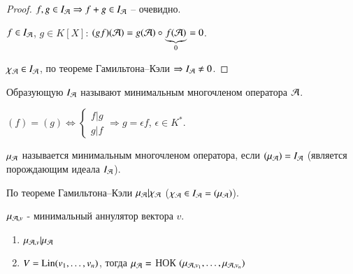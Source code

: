 \documentclass[main]{subfiles}
\begin{document}
\begin{proof}
    $f, g \in I_{\mathcal{A}} \Rightarrow f+g \in I_{\mathcal{A}}$ -- очевидно.

    $f \in I_{\mathcal{A}}$, $g \in K[X]$: $(gf)(\mathcal{A}) = g(\mathcal{A}) \circ \underbrace{f(\mathcal{A})}_{0} = 0$.

    $\chi_{\mathcal{A}} \in I_{\mathcal{A}}$,  по теореме Гамильтона--Кэли $\Rightarrow I_{\mathcal{A}} \neq 0$.
\end{proof}

Образующую $I_{\mathcal{A}}$ называют минимальным многочленом  оператора $\mathcal{A}$.

\begin{remark}
    $(f) = (g) \Leftrightarrow \begin{cases}
            f|g \\
            g|f
        \end{cases} \Rightarrow g = \epsilon f$, $\epsilon \in K^*$.
\end{remark}

\begin{definition} 
    $\mu_{\mathcal{A}}$ называется минимальным многочленом оператора, если $(\mu_{\mathcal{A}}) = I_{\mathcal{A}}$ (является порождающим идеала $I_{\mathcal{A}}$).
\end{definition}

По теореме Гамильтона--Кэли $\mu_{\mathcal{A}}|\chi_{\mathcal{A}}$ ($\chi_{\mathcal{A}} \in I_{\mathcal{A}} = (\mu_{\mathcal{A}})$).

$\mu_{\mathcal{A}, v}$ - минимальный аннулятор вектора $v$.
\begin{proposition}
    \begin{enumerate}
        \item $\mu_{\mathcal{A}, v} | \mu_{\mathcal{A}}$
        \item $V = \operatorname{Lin}(v_1, \ldots, v_n)$, тогда $\mu_{\mathcal{A}} = $ НОК $(\mu_{\mathcal{A}, v_1}, \ldots, \mu_{\mathcal{A}, v_n})$
    \end{enumerate}
\end{proposition}
\end{document}
